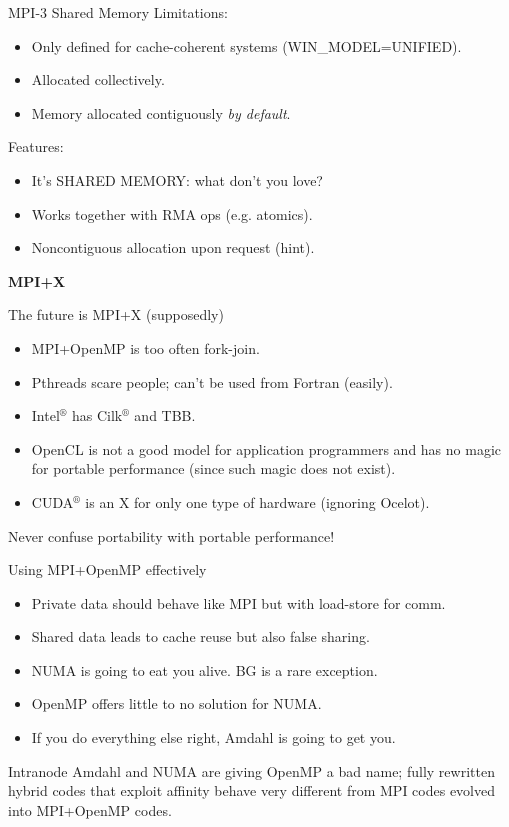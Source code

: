 \documentclass[11pt]{beamer}
\begin{document}
\begin{frame}{MPI-3 Shared Memory}\Large
    Limitations: \\
    \begin{itemize}
        \item Only defined for cache-coherent systems (WIN\_MODEL=UNIFIED).
        \item Allocated collectively.
        \item Memory allocated contiguously \textit{by default}.
    \end{itemize}
    Features: \\
    \begin{itemize}
        \item It's SHARED MEMORY: what don't you love?
        \item Works together with RMA ops (e.g. atomics).
        \item Noncontiguous allocation upon request (hint).
    \end{itemize}
\end{frame}

\begin{frame}{} \LARGE
  \begin{center}
      \textbf{MPI+X}
  \end{center}
\end{frame}

\begin{frame}[fragile]{The future is MPI+X (supposedly)} \large
\begin{itemize}
	\item MPI+OpenMP is too often fork-join.
	\item Pthreads scare people; can't be used from Fortran (easily).
	\item Intel$^\circledR$ has Cilk$^\circledR$ and TBB.
	\item OpenCL is not a good model for application programmers
          and has no magic for portable performance (since such magic does not exist).
	\item CUDA$^\circledR$ is an X for only one type of hardware (ignoring Ocelot).
\end{itemize}
Never confuse portability with portable performance!
\end{frame}

\begin{frame}{Using MPI+OpenMP effectively} \large 
\begin{itemize}
	\item Private data should behave like MPI but with load-store for comm.
	\item Shared data leads to cache reuse but also false sharing.
	\item NUMA is going to eat you alive.  BG is a rare exception.
	\item OpenMP offers little to no solution for NUMA.
	\item If you do everything else right, Amdahl is going to get you.
\end{itemize}
Intranode Amdahl and NUMA are giving OpenMP a bad name;
fully rewritten hybrid codes that exploit affinity behave very different
from MPI codes evolved into MPI+OpenMP codes.
\end{frame}
\end{document}

